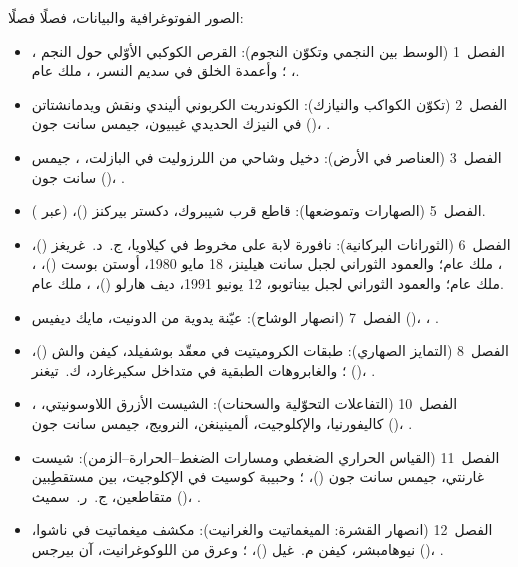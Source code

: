 \bigskip
\noindent الصور الفوتوغرافية والبيانات، فصلًا فصلًا:
\begin{itemize}\small
  \item الفصل~1 (الوسط بين النجمي وتكوّن النجوم): القرص الكوكبي الأوّلي حول النجم ، ، ؛ وأعمدة الخلق في سديم النسر، ، ملك عام.
  \item الفصل~2 (تكوّن الكواكب والنيازك): الكوندريت الكربوني أليندي ونقش ويدمانشتاتن في النيزك الحديدي غيبيون، جيمس سانت جون ()، .
  \item الفصل~3 (العناصر في الأرض): دخيل وشاحي من اللرزوليت في البازلت، ، جيمس سانت جون ()، .
  \item الفصل~5 (الصهارات وتموضعها): قاطع قرب شيبروك، دكستر بيركنز ()،  (عبر ).
  \item الفصل~6 (الثورانات البركانية): نافورة لابة على مخروط  في كيلاويا، ج.~د.~غريغز ()، ، ملك عام؛ والعمود الثوراني لجبل سانت هيلينز، 18 مايو 1980، أوستن بوست ()، ، ملك عام؛ والعمود الثوراني لجبل بيناتوبو، 12 يونيو 1991، ديف هارلو ()، ، ملك عام.
  \item الفصل~7 (انصهار الوشاح): عيّنة يدوية من الدونيت، مايك ديفيس ()، ، .
  \item الفصل~8 (التمايز الصهاري): طبقات الكروميتيت في معقّد بوشفيلد، كيفن والش ()، ؛ والغابروهات الطبقية في متداخل سكيرغارد، ك.~تيغنر ()، .
  \item الفصل~10 (التفاعلات التحوّلية والسحنات): الشيست الأزرق اللاوسونيتي، ، كاليفورنيا، والإكلوجيت، ألمينينغن، النرويج، جيمس سانت جون ()، .
  \item الفصل~11 (القياس الحراري الضغطي ومسارات الضغط--الحرارة--الزمن): شيست غارنتي، جيمس سانت جون ()، ؛ وحبيبة كوسيت في الإكلوجيت، بين مستقطِبين متقاطعين، ج.~ر.~سميث ()، .
  \item الفصل~12 (انصهار القشرة: الميغماتيت والغرانيت): مكشف ميغماتيت في ناشوا، نيوهامبشر، كيفن م.~غيل ()، ؛ وعرق من اللوكوغرانيت، آن بيرجس ()، .

\end{itemize}
